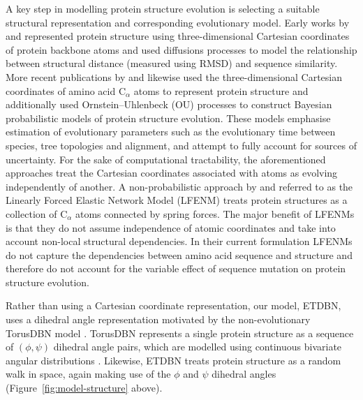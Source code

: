 \documentclass[nogrid]{MBE}%
\begin{document}
A key step in modelling protein structure evolution is selecting a suitable structural representation and corresponding evolutionary model. Early works by \citet{gutin1994evolution} and \citet{grishin1997estimation} represented protein structure using three-dimensional Cartesian coordinates of protein backbone atoms and used diffusions processes to model the relationship between structural distance (measured using RMSD) and sequence similarity. More recent publications by \citet{challis2012stochastic} and \citet{herman2014simultaneous} likewise used the three-dimensional Cartesian coordinates of amino acid  $\text{C}_{\alpha}$ atoms to represent protein structure and additionally used Ornstein--Uhlenbeck (OU) processes to construct Bayesian probabilistic models of protein structure evolution. These models emphasise estimation of evolutionary parameters such as the evolutionary time between species, tree topologies and alignment, and attempt to fully account for sources of uncertainty. For the sake of computational tractability, the aforementioned approaches treat the Cartesian coordinates associated with atoms as evolving independently of another. A non-probabilistic approach by \citet{echave2008evolutionary} and \citet{echave2010perturbative} referred to as the Linearly Forced Elastic Network Model (LFENM)  treats protein structures as a collection of $\text{C}_{\alpha}$ atoms connected by spring forces. The major benefit of LFENMs is that they do not assume independence of atomic coordinates and take into account non-local structural dependencies. In their current formulation LFENMs do not capture the dependencies between amino acid sequence and structure and therefore do not account for the variable effect of sequence mutation on protein structure evolution.

Rather than using a Cartesian coordinate representation, our model, ETDBN, uses a dihedral angle representation motivated by the non-evolutionary TorusDBN model \citep{boomsma2008generative, boomsma2014equilibrium}. TorusDBN represents a single protein structure as a sequence of $(\phi,\psi)$ dihedral angle pairs, which are modelled using continuous bivariate angular distributions \citep{frellsen2012towards}. Likewise, ETDBN treats protein structure  as a random walk in space, again making use of the $\phi$ and $\psi$ dihedral angles (Figure~\ref{fig:model-structure} above).
\end{document}
